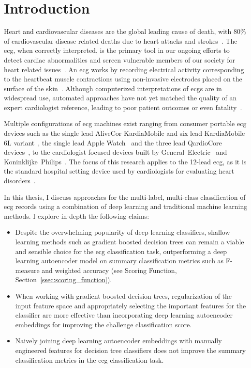 \documentclass[\main/thesis.tex]{subfiles}
\begin{document}
\chapter{Introduction}

Heart and cardiovascular diseases are the global leading cause of death, with 80\% of cardiovascular disease related deaths due to heart attacks and strokes~\cite{doi:10.1161/CIR.0000000000000757}.
The \acrfull{ecg}, when correctly interpreted, is the primary tool in our ongoing efforts to detect cardiac abnormalities and screen vulnerable members of our society for heart related issues~\cite{SMULYAN2019153}.
An \gls{ecg} works by recording electrical activity corresponding to the heartbeat muscle contractions using non-invasive electrodes placed on the surface of the skin~\cite{bonow2011braunwald}.
Although computerized interpretations of \gls{ecg}s are in widespread use, automated approaches have not yet matched the quality of an expert cardiologist reference, leading to poor patient outcomes or even fatality~\cite{BREEN2019}.

Multiple configurations of \gls{ecg} machines exist ranging from consumer portable \gls{ecg} devices such as the single lead AliveCor KardiaMobile and six lead KardiaMobile 6L variant~\cite{alivecor-website}, the single lead Apple Watch~\cite{apple-watch} and the three lead QardioCore devices~\cite{quardiocore-website}, to the cardiologist focused devices built by General~Electric~\cite{generalelectric-website} and Koninklijke~Philips~\cite{koninklijkephilips-website}.
The focus of this research applies to the 12-lead \gls{ecg}, as it is the standard hospital setting device used by cardiologists for evaluating heart disorders~\cite{kligfield_paul_recommendations_2007}.

In this thesis, I discuss approaches for the multi-label, multi-class classification of \gls{ecg} records using a combination of deep learning and traditional machine learning methods.
I explore in-depth the following claims:
\begin{itemize}
    \item Despite the overwhelming popularity of deep learning classifiers, shallow learning methods such as gradient boosted decision trees can remain a viable and sensible choice for the \gls{ecg} classification task, outperforming a deep learning autoencoder model on summary classification metrics such as F-measure and weighted accuracy (see Scoring Function, Section~\ref{ssec:scoring_function}).
    \item When working with gradient boosted decision trees, regularization of the input feature space and appropriately selecting the important features for the classifier are more effective than incorporating deep learning autoencoder embeddings for improving the challenge classification score.
    \item Naively joining deep learning autoencoder embeddings with manually engineered features for decision tree classifiers does not improve the summary classification metrics in the \gls{ecg} classification task.
\end{itemize}
\end{document}
